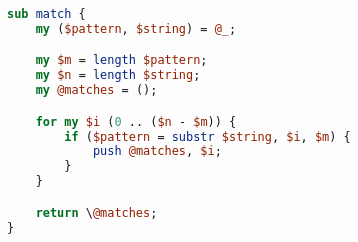 \begin{lstlisting}[language=Perl,caption={Perl naive implementation},label={lst:naive_perl}]
sub match {
    my ($pattern, $string) = @_;

    my $m = length $pattern;
    my $n = length $string;
    my @matches = ();

    for my $i (0 .. ($n - $m)) {
        if ($pattern = substr $string, $i, $m) {
            push @matches, $i;
        }
    }

    return \@matches;
}
\end{lstlisting}
